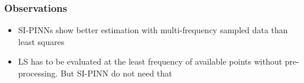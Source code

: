 
\begin{frame}
	\frametitle{Observations}
	\begin{itemize}
		\item SI-PINNs show better estimation with multi-frequency sampled data than least squares
			\vspace{1cm}
		\item LS has to be evaluated at the least frequency of available points without
			pre-processing. But SI-PINN do not need that
	\end{itemize}
\end{frame}

